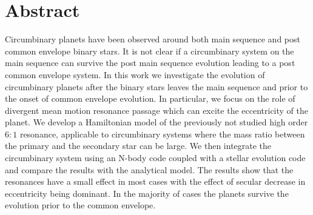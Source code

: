 \begingroup
\let\clearpage\relax
\let\cleardoublepage\relax
\let\cleardoublepage\relax

\chapter*{Abstract}
Circumbinary planets have been observed around both main sequence and post 
common envelope binary stars. It is not clear if a circumbinary system on the
main sequence can survive the post main sequence evolution leading to a
post common envelope system. In this work we investigate the evolution 
of circumbinary planets after the binary stars leaves the main sequence and prior to
the onset of common envelope evolution. In particular, we focus on the role
of divergent mean motion resonance passage which can excite the eccentricity 
of the planet. We develop a Hamiltonian model of the previously not 
studied high order $6:1$ resonance, applicable to circumbinary systems 
where the mass ratio
between the primary and the secondary star can be large. We 
then integrate
the circumbinary system using an N-body code coupled with a stellar evolution 
code and compare the results with the analytical model. The results show that
the resonances have a small effect in most cases with the effect of secular
decrease in eccentricity being dominant. In the majority of 
cases the planets survive the 
evolution prior to the common envelope.
\vfill

\endgroup			

\vfill
